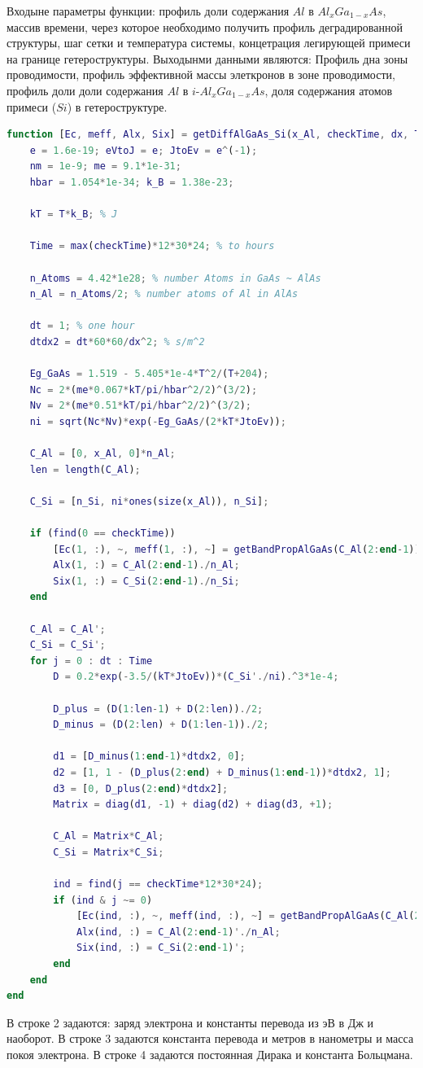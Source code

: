 Входыне параметры функции: профиль доли содержания $Al$ в $Al_{x}Ga_{1-x}As$, массив времени, через которое необходимо получить профиль деградированной структуры, шаг сетки и температура системы, концетрация легирующей примеси на границе гетероструктуры. Выходынми данными являются: Профиль дна зоны проводимости, профиль эффективной массы элеткронов в зоне проводимости, профиль доли доли содержания $Al$ в $i$-$Al_{x}Ga_{1-x}As$, доля содержания атомов примеси ($Si$) в гетероструктуре.
\begin{lstlisting}[style=realcode,language=Matlab,caption={Функция расчета диффузионного расплытия атомов $Al$ в <<открытой>> системе $i$-$Al_{x}Ga_{1-x}As$ с учетом коэффициента диффузии, зависящего от концентрации легирующей примеси},label={lst:DFromC}]
function [Ec, meff, Alx, Six] = getDiffAlGaAs_Si(x_Al, checkTime, dx, T, n_Si)
	e = 1.6e-19; eVtoJ = e; JtoEv = e^(-1);
	nm = 1e-9; me = 9.1*1e-31;
	hbar = 1.054*1e-34; k_B = 1.38e-23;

	kT = T*k_B; % J

	Time = max(checkTime)*12*30*24; % to hours

	n_Atoms = 4.42*1e28; % number Atoms in GaAs ~ AlAs
	n_Al = n_Atoms/2; % number atoms of Al in AlAs

	dt = 1; % one hour
	dtdx2 = dt*60*60/dx^2; % s/m^2

	Eg_GaAs = 1.519 - 5.405*1e-4*T^2/(T+204);
	Nc = 2*(me*0.067*kT/pi/hbar^2/2)^(3/2);
	Nv = 2*(me*0.51*kT/pi/hbar^2/2)^(3/2);
	ni = sqrt(Nc*Nv)*exp(-Eg_GaAs/(2*kT*JtoEv));

	C_Al = [0, x_Al, 0]*n_Al;
	len = length(C_Al);

	C_Si = [n_Si, ni*ones(size(x_Al)), n_Si];

	if (find(0 == checkTime))
		[Ec(1, :), ~, meff(1, :), ~] = getBandPropAlGaAs(C_Al(2:end-1));
		Alx(1, :) = C_Al(2:end-1)./n_Al;		
		Six(1, :) = C_Si(2:end-1)./n_Si;		
	end

	C_Al = C_Al';
	C_Si = C_Si';
	for j = 0 : dt : Time
		D = 0.2*exp(-3.5/(kT*JtoEv))*(C_Si'./ni).^3*1e-4;

		D_plus = (D(1:len-1) + D(2:len))./2;
		D_minus = (D(2:len) + D(1:len-1))./2;

		d1 = [D_minus(1:end-1)*dtdx2, 0];
		d2 = [1, 1 - (D_plus(2:end) + D_minus(1:end-1))*dtdx2, 1];
		d3 = [0, D_plus(2:end)*dtdx2];
		Matrix = diag(d1, -1) + diag(d2) + diag(d3, +1);

		C_Al = Matrix*C_Al;
		C_Si = Matrix*C_Si;

		ind = find(j == checkTime*12*30*24); 
		if (ind & j ~= 0)
			[Ec(ind, :), ~, meff(ind, :), ~] = getBandPropAlGaAs(C_Al(2:end-1)');
			Alx(ind, :) = C_Al(2:end-1)'./n_Al;
			Six(ind, :) = C_Si(2:end-1)';
		end
	end
end
\end{lstlisting}
В строке 2 задаются: заряд электрона и константы перевода из эВ в Дж и наоборот. В строке 3 задаются константа перевода и метров в нанометры и масса покоя электрона. В строке 4 задаются постоянная Дирака и константа Больцмана.


